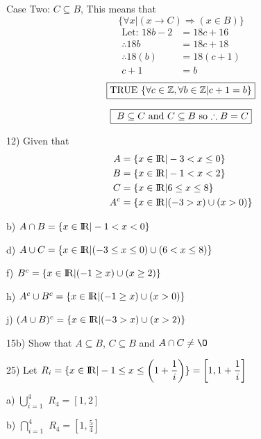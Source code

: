 \documentclass[11pt]{article}
\newcommand*{\mybox}[1]{\framebox{#1}}
\begin{document}
\begin{flushleft}
\newpage

Case Two: $C\subseteq B$, This means that $$\{ \forall x | (x\to C)\Rightarrow (x\in B) \}$$
\vspace{-9mm}
\begin{align*}
\text{Let: } 18b-2 &= 18c+16\\
\therefore 18b &= 18c+18\\
\therefore 18(b) &= 18(c+1) \\
c+1&=b
\end{align*}
\vspace{-7mm}
$$\text{\mybox{TRUE $\{ \forall c \in \mathbb{Z} , \forall b \in \mathbb{Z} | c+1=b \}  $}}$$

$$\text{\mybox{ $B\subseteq C$ and $C\subseteq B$ so $\therefore B = C$}}$$

\hrulefill

12) Given that 
\vspace{-5mm}
\begin{align*}
A &= \{ x \in {\rm I\!R} | -3 < x \leq 0 \}\\
B &= \{ x \in {\rm I\!R} | -1 < x < 2 \}\\
C &= \{ x \in {\rm I\!R} | 6 \leq x \leq 8 \}\\
A^c &= \{ x \in {\rm I\!R} | (-3>x) \cup (x > 0) \}
\end{align*}

b) $A\cap B = \{ x \in {\rm I\!R} | -1<x<0 \}$

d) $A\cup C = \{ x \in {\rm I\!R} | (-3\leq x \leq 0)\cup (6<x\leq 8) \} $

f) $B^c = \{ x \in {\rm I\!R} | (-1 \geq x) \cup (x\geq 2) \} $

h) $A^c \cup B^c = \{ x \in {\rm I\!R} | (-1 \geq x) \cup (x>0) \} $

j) $(A\cup B)^c = \{ x \in {\rm I\!R} | (-3>x)\cup (x>2)\}$ 

\hrulefill

15b) Show that $A\subseteq B$, $C\subseteq B$ and $A\cap C \neq \O$

\vspace{30mm}


\hrulefill

25) Let $R_i = \{ x \in {\rm I\!R} | -1 \leq x \leq \left( 1 + \displaystyle{\frac{1}{i}} \right) \} = \left[1,1 + \displaystyle{\frac{1}{i}} \right] $

a) $\bigcup\limits_{i=1}^{4}$ $R_4 = \left[ 1,2 \right]$

b) $\bigcap\limits_{i=1}^{4}$ $R_4 = \left[ 1,\displaystyle{\frac{5}{4}} \right]$


\end{flushleft}
\end{document}
